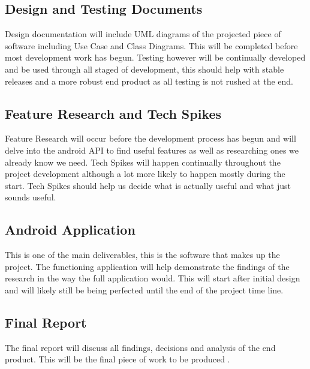 \documentclass[10pt,a4paper]{article}
\begin{document}
\subsection{Design and Testing Documents}
Design documentation will include UML diagrams of the projected piece of software including Use Case and Class Diagrams. This will be completed before most development work has begun. Testing however will be continually developed and be used through all staged of development, this should help with stable releases and a more robust end product as all testing is not rushed at the end. 
\subsection{Feature Research and Tech Spikes}
Feature Research will occur before the development process has begun and will delve into the android API\cite{goog2015} to find useful features as well as researching ones we already know we need. Tech Spikes will happen continually throughout the project development although a lot more likely to happen mostly during the start. Tech Spikes should help us decide what is actually useful and what just sounds useful. 
\subsection{Android Application}
This is one of the main deliverables, this is the software that makes up the project. The functioning application will help demonstrate the findings of the research in the way the full application would. This will start after initial design and will likely still be being perfected until the end of the project time line. 
\subsection{Final Report}
The final report will discuss all findings, decisions and analysis of the end product. This\nocite{shyi} will be the final piece of work to be produced  . \nocite{shala2011}
\newpage



\end{document}
